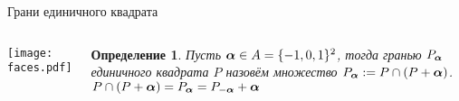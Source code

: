 \documentclass[aspectratio=1610, 10pt, notheorems]{beamer}
\newtheorem{definition}  {Определение}
\begin{document}


\begin{frame}{Грани единичного квадрата}
\begin{columns}
\texttt{[image: faces.pdf]}
\begin{definition}
Пусть ${\bm{\alpha}}\in A=\{-1,0,1\}^2$, тогда {\em гранью $P_{\bm{\alpha}}$ единичного квадрата $P$} назовём множество $P_{\bm{\alpha}}:=P\cap(P+{\bm{\alpha}})$.\\
$P\cap(P+{\bm{\alpha}})=P_{\bm{\alpha}}=P_{-{\bm{\alpha}}}+{\bm{\alpha}}$
\end{definition}
\end{columns}
\end{frame}


\begin{frame}{}

\end{frame}


\begin{frame}{}

\end{frame}


\begin{frame}{}

\end{frame}


\begin{frame}{}

\end{frame}


\begin{frame}{}

\end{frame}


\begin{frame}{}

\end{frame}
\end{document}
